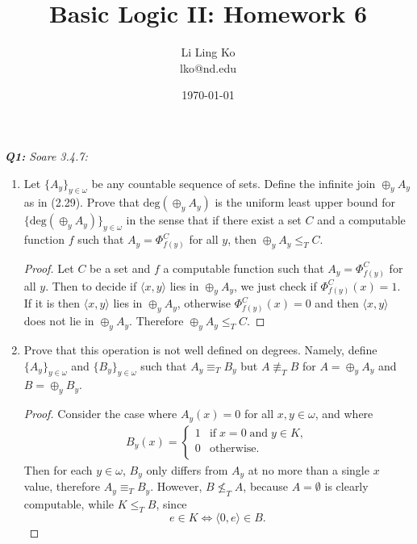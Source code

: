 \documentclass{article}
\begin{document}
\title{Basic Logic II: Homework 6}
\author{Li Ling Ko\\ lko@nd.edu}
\date{\today}
\maketitle

\it \textbf{Q1:} Soare 3.4.7:
  \begin{enumerate}[label={\bf (\alph*):}]
    \item Let $\{A_y\}_{y\in\omega}$ be any countable sequence of sets.
      Define the infinite join $\oplus_y A_y$ as in (2.29). Prove that
      $\text{deg}(\oplus_y A_y)$ is the uniform least upper bound for
      $\{\text{deg}(\oplus_y A_y)\}_{y\in\omega}$ in the sense that if
      there exist a set $C$ and a computable function $f$ such that
      $A_y=\Phi_{f(y)}^C$ for all $y$, then $\oplus_y A_y\leq_T C$.

      \begin{proof}
        Let $C$ be a set and $f$ a computable function such that
        $A_y=\Phi_{f(y)}^C$ for all $y$. Then to decide if $\langle
        x,y\rangle$ lies in $\oplus_y A_y$, we just check if
        $\Phi_{f(y)}^C(x)=1$. If it is then $\langle x,y\rangle$ lies in
        $\oplus_y A_y$, otherwise $\Phi_{f(y)}^C(x)=0$ and then $\langle
        x,y\rangle$ does not lie in $\oplus_y A_y$. Therefore $\oplus_y
        A_y\leq_T C$.
      \end{proof}

    \item Prove that this operation is not well defined on degrees. Namely,
      define $\{A_y\}_{y\in\omega}$ and  $\{B_y\}_{y\in\omega}$ such that
      $A_y \equiv_T B_y$ but $A\not\equiv_T B$ for $A=\oplus_y A_y$ and
      $B=\oplus_y B_y$.

      \begin{proof}
        Consider the case where $A_y(x)=0$ for all $x,y\in\omega$, and
        where
        \begin{align*}
          B_y(x) =
          \begin{cases}
            1 &\text{if}\; x=0\; \text{and}\; y\in K,\\
            0 &\text{otherwise}.\\
          \end{cases}
        \end{align*}
        Then for each $y\in\omega$, $B_y$ only differs from $A_y$ at no
        more than a single $x$ value, therefore $A_y\equiv_T B_y$. However,
        $B\not\leq_T A$, because $A=\emptyset$ is clearly computable,
        while $K\leq_T B$, since
        \[e\in K \Leftrightarrow \langle 0,e\rangle \in B.\]
      \end{proof}
  \end{enumerate}
\end{document}
